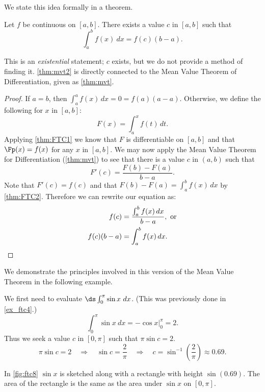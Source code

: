 We state this idea formally in a theorem.

{Let $f$ be continuous on $[a,b]$. There exists a value $c$ in $[a,b]$ such that
\[\int_a^bf(x)\ dx = f(c)(b-a).\]}

This is an \emph{existential} statement; $c$ exists, but we do not provide a method of finding it. \autoref{thm:mvt2} is directly connected to the Mean Value Theorem of Differentiation, given %
as \autoref{thm:mvt}. %

\begin{proof}
If $a=b$, then $\int_a^a f(x)\,dx =0=f(a)(a-a)$. Otherwise, we define the following for $x$ in $[a,b]$:
\[ F(x)=\int_a^x f(t)\,dt.\]
Applying \autoref{thm:FTC1} we know that $F$ is differentiable on $[a,b]$ and that $\Fp(x)=f(x)$ for any $x$ in $[a,b]$. We may now apply the Mean Value Theorem for Differentiation (\autoref{thm:mvt}) to see that there is a value $c$ in $(a,b)$ such that
\[F'(c)=\frac{F(b)-F(a)}{b-a}.\]
Note that $F'(c)=f(c)$ and that $F(b)-F(a)=\int_a^b f(x)\,dx$ by \autoref{thm:FTC2}. Therefore we can rewrite our equation as: 
\begin{align*}
f(c)&=\frac{\int_a^b f(x)\,dx}{b-a},\text{ or}\\
f(c)(b-a)&=\int_a^b f(x)\,dx.\qedhere
\end{align*}
\end{proof}

We demonstrate the principles involved in this version of the Mean Value Theorem in the following example.


{We first need to evaluate $\ds\int_0^\pi \sin x\ dx$. (This was previously done in \autoref{ex_ftc4}.)
\[\int_0^\pi\sin x\ dx = -\cos x \Big|_0^\pi = 2.\]
Thus we seek a value $c$ in $[0,\pi]$ such that $\pi\sin c =2$. 
\[
 \pi\sin c = 2\quad \Rightarrow\quad
 \sin c =\frac2\pi\quad \Rightarrow\quad
 c = \sin^{-1}\left(\frac2\pi\right) \approx 0.69.
\]

In \autoref{fig:ftc8} $\sin x$ is sketched along with a rectangle with height $\sin (0.69)$. The area of the rectangle is the same as the area under $\sin x$ on $[0,\pi]$.}

